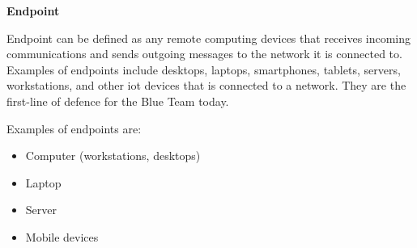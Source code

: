 \begin{multicols}{2}
      \textbf{Endpoint}

      Endpoint can be defined as any remote computing devices that receives incoming communications and sends outgoing messages
      to the network it is connected to. Examples of endpoints include desktops, laptops, smartphones, tablets, servers, workstations,
      and other \acrshort{iot} devices that is connected to a network. They are the first-line of defence for the Blue Team today.

      Examples of endpoints are:
      \begin{itemize}
            \item Computer (workstations, desktops)
            \item Laptop
            \item Server
            \item Mobile devices
      \end{itemize}







\end{multicols}
